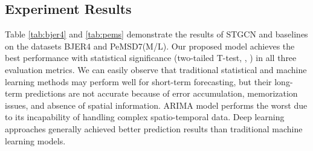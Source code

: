 \documentclass{article}
\begin{document}
\subsection{Experiment Results} 
Table \ref{tab:bjer4} and \ref{tab:pems} demonstrate the results of STGCN and baselines on the datasets BJER4 and PeMSD7(M/L). Our proposed model achieves the best performance with statistical significance (two-tailed T-test, , ) in all three evaluation metrics. We can easily observe that traditional statistical and machine learning methods may perform well for short-term forecasting, but their long-term predictions are not accurate because of error accumulation, memorization issues, and absence of spatial information. ARIMA model performs the worst due to its incapability of handling complex spatio-temporal data. Deep learning approaches generally achieved better prediction results than traditional machine learning models.

\begin{table}
\centering
{}
\caption{Performance comparison of different approaches on the dataset BJER4.}
\label{tab:bjer4}
\end{table}
\end{document}

